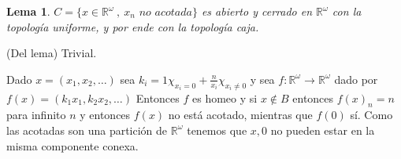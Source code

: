 \documentclass[11pt]{article}
\newcommand{\R}{{\mathbb{R}}}
\newcommand{\sette}[2]{\{#1 \ , \ #2 \}}
\newtheorem{lemma}[theorem]{Lema}
\newenvironment{proof}[1][Demostraci\'on]{\begin{trivlist}
\item[\hskip \labelsep {\bfseries #1}]}{\end{trivlist}}
\newcommand{\qed}{\nobreak \ifvmode \relax \else
      \ifdim\lastskip<1.5em \hskip-\lastskip
      \hskip1.5em plus0em minus0.5em \fi \nobreak
      \vrule height0.75em width0.5em depth0.25em\fi}
\begin{document}
\begin{proof}
\begin{enumerate}
\begin{lemma}
$C = \sette{x \in \R^{\omega}}{x_n \textit{ no acotada}}$ es abierto y cerrado en $\R^{\omega}$ con la topolog\'ia uniforme, y por ende con la topolog\'ia caja.
\end{lemma}

\begin{proof} (Del lema)
Trivial.
\end{proof}

Dado $x = (x_1,x_2 , \dots)$ sea $k_i = 1 \chi_{x_i = 0} + \frac{n}{x_i} \chi_{x_i \neq 0}$ y sea $f: \R^{\omega} \rightarrow \R^{\omega}$ dado por $f(x) = (k_1x_1 , k_2x_2 , \dots)$ Entonces $f$ es homeo y si $x \not \in B$ entonces $f(x)_n = n$ para infinito $n$ y entonces $f(x)$ no est\'a acotado, mientras que $f(0)$ s\'i. Como las acotadas son una partici\'on de $\R^{\omega}$ tenemos que $x,0$ no pueden estar en la misma componente conexa. \qed

\end{enumerate} 
 
\end{proof}

\bigskip
\end{document}
